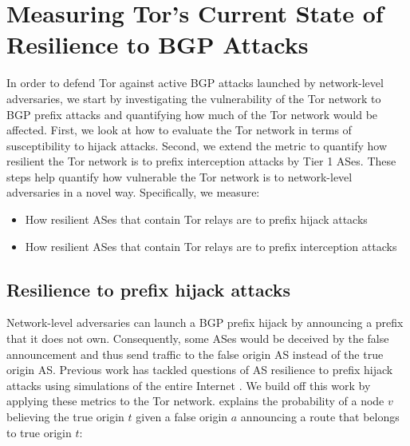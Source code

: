 \section{Measuring Tor's Current State of Resilience to BGP Attacks}
\label{hijack_interception_measurement}

In order to defend Tor against active BGP attacks launched by network-level adversaries, we start by investigating the vulnerability of the Tor network to BGP prefix attacks and quantifying how much of the Tor network would be affected. First, we look at how to evaluate the Tor network in terms of susceptibility to hijack attacks. Second, we extend the metric to quantify how resilient the Tor network is to prefix interception attacks by Tier 1 ASes. These steps help quantify how vulnerable the Tor network is to network-level adversaries in a novel way.  Specifically, we measure:

\begin{itemize}
\item How resilient ASes that contain Tor relays are to prefix hijack attacks
\item How resilient ASes that contain Tor relays are to prefix interception attacks
\end{itemize}

\subsection{Resilience to prefix hijack attacks}
\label{hijack_methodology}

Network-level adversaries can launch a BGP prefix hijack by announcing a prefix that it does not own. Consequently, some ASes would be deceived by the false announcement and thus send traffic to the false origin AS instead of the true origin AS. Previous work has tackled questions of AS resilience to prefix hijack attacks using simulations of the entire Internet \cite{lad2007understanding}.  We build off this work by applying these metrics to the Tor network. \cite{lad2007understanding} explains the probability of a node $v$ believing the true origin $t$ given a false origin $a$ announcing a route that belongs to true origin $t$:

